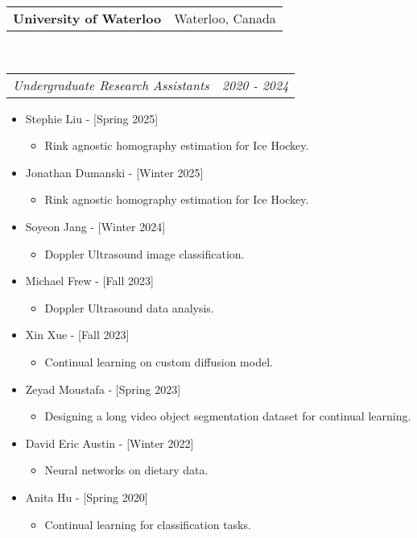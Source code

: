 \documentclass[letterpaper,11pt]{article}
\makeatletter
\newcommand{\resumeItem}[2]{
  \item\small{
    {#1}{#2 \vspace{-2pt}}
  }
}
\newcommand{\resumeSubheading}[4]{
  \vspace{-1pt}\item
    \begin{tabular*}{0.97\textwidth}{l@{\extracolsep{\fill}}r}
      \textbf{#1} & #2 \\
    \end{tabular*}\vspace{-1pt}\\
    \begin{tabular*}{0.97\textwidth}{l@{\extracolsep{\fill}}r}
      \textit{\small#3} & \textit{\small #4} 
    \end{tabular*}\vspace{-5 pt}
}
\newcommand{\resumeItemListStart}{\begin{itemize}}
\newcommand{\resumeItemListEnd}{\end{itemize}\vspace{-5pt}}
\makeatother
\begin{document}
    \resumeSubheading
      {University of Waterloo}{Waterloo, Canada}
      {Undergraduate Research Assistants}{2020 - 2024}
      \resumeItemListStart
        \resumeItem{{Stephie Liu - [Spring 2025]}}
          {}
        \begin{itemize}
            \item{Rink agnostic homography estimation for Ice Hockey.}
        \end{itemize}  
        \resumeItem{{Jonathan Dumanski - [Winter 2025]}}
          {}
        \begin{itemize}
            \item{Rink agnostic homography estimation for Ice Hockey.}
        \end{itemize}  
        \resumeItem{{Soyeon Jang - [Winter 2024]}}
          {}
        \begin{itemize}
            \item{Doppler Ultrasound image classification.}
        \end{itemize}  
      \resumeItem{{Michael Frew - [Fall 2023]}}
          {}
        \begin{itemize}
            \item{Doppler Ultrasound data analysis.}
        \end{itemize}        
      \resumeItem{{Xin Xue - [Fall 2023]}}
          {}
        \begin{itemize}
            \item{Continual learning on custom diffusion model.}
        \end{itemize}      
      \resumeItem{{Zeyad Moustafa - [Spring 2023]}}
          {}
        \begin{itemize}
            \item{Designing a long video object segmentation dataset for continual learning.}
        \end{itemize}
      \resumeItem{{David Eric Austin - [Winter 2022]}}
          {}
        \begin{itemize}
            \item{Neural networks on dietary data.}
        \end{itemize}
      \resumeItem{{Anita Hu - [Spring 2020]}}
          {}
        \begin{itemize}
            \item{Continual learning for classification tasks.}
        \end{itemize}    
      \resumeItemListEnd
\end{document}
